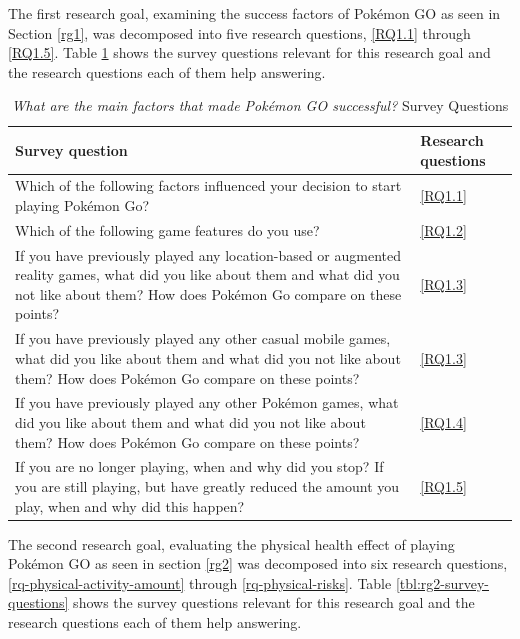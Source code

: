 The first research goal, examining the success factors of Pokémon GO as seen in Section \ref{rg1}, was decomposed into five research questions, \ref{RQ1.1} through \ref{RQ1.5}. Table \ref{tbl:rg1-survey-questions} shows the survey questions relevant for this research goal and the research questions each of them help answering.

\begin{table}[h]
	\caption{\emph{What are the main factors that made Pokémon GO successful?} Survey Questions}
	\centering
	\label{tbl:rg1-survey-questions}
	\begin{tabularx}{\textwidth}{|X|l|}
		\hline
		\textbf{Survey question} & \textbf{Research questions}\\
		\hline\hline
		
		Which of the following factors influenced your decision to start playing Pokémon Go? & \ref{RQ1.1}\\
		\hline
		
		Which of the following game features do you use? & \ref{RQ1.2}\\
		\hline
		
		If you have previously played any location-based or augmented reality games, what did you like about them and what did you not like about them? How does Pokémon Go compare on these points? & \ref{RQ1.3}\\
		\hline
		
		If you have previously played any other casual mobile games, what did you like about them and what did you not like about them? How does Pokémon Go compare on these points? & \ref{RQ1.3}\\
		\hline
		
		If you have previously played any other Pokémon games, what did you like about them and what did you not like about them? How does Pokémon Go compare on these points? & \ref{RQ1.4}\\
		\hline
		
		If you are no longer playing, when and why did you stop? If you are still playing, but have greatly reduced the amount you play, when and why did this happen? & \ref{RQ1.5}\\
		\hline
	\end{tabularx}
\end{table}

The second research goal, evaluating the physical health effect of playing Pokémon GO as seen in section \ref{rg2} was decomposed into six research questions, \ref{rq-physical-activity-amount} through \ref{rq-physical-risks}. Table \ref{tbl:rg2-survey-questions} shows the survey questions relevant for this research goal and the research questions each of them help answering.

